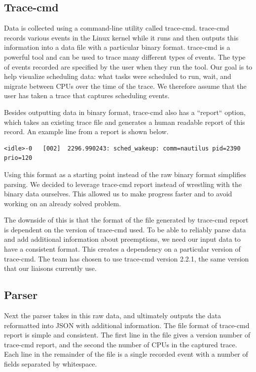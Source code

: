 \documentclass{hmcclinic}
\begin{document}
  \subsection{Trace-cmd}

  Data is collected using a command-line utility called trace-cmd.
  trace-cmd records various events in the Linux kernel while it runs and then
  outputs this information into a data file with a particular binary format.
  trace-cmd is a powerful tool and can be used to trace many different types of
  events. The type of events recorded are specified by the user when they run
  the tool. Our goal is to help visualize scheduling data: what tasks were
  scheduled to run, wait, and migrate between CPUs over the time of the trace.
  We therefore assume that the user has taken a trace that captures scheduling
  events.

  Besides outputting data in binary format, trace-cmd also has a ``report``
  option, which takes an existing trace file and generates a human readable
  report of this record. An example line from a report is shown below.
  
\footnotesize\begin{verbatim}<idle>-0   [002]  2296.990243: sched_wakeup: comm=nautilus pid=2390 prio=120\end{verbatim}

\normalsize
  Using this format as a starting point instead of the
  raw binary format simplifies parsing.  We decided to leverage trace-cmd report
  instead of wrestling with the binary data ourselves. This allowed us to make
  progress faster and to avoid working on an already solved problem.

  The downside of this is that the format of the file generated by trace-cmd
  report is dependent on the version of trace-cmd used. To be able to reliably
  parse data and add additional information about preemptions, we need our input
  data to have a consistent format. This creates a dependency on a particular
  version of trace-cmd. The team has chosen to use trace-cmd version 2.2.1, 
  the same version that our liaisons currently use.

  \subsection{Parser}
  Next the parser takes in this raw data, and ultimately outputs the data
  reformatted into JSON with additional information. The file format of
  trace-cmd report is simple and consistent. The first line in the file
  gives a version number of trace-cmd report, and the second the number of
  CPUs in the captured trace. Each line in the remainder of the file is a
  single recorded event with a number of fields separated by whitespace.
   
\end{document}
